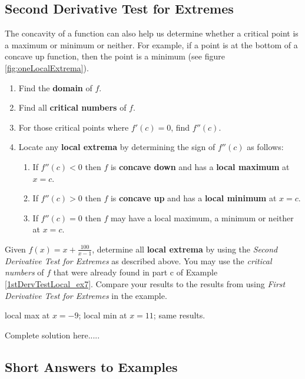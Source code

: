 \subsection*{Second Derivative Test for Extremes}
\noindent The concavity of a function can also help us determine whether a critical point is a maximum or minimum or neither. For example, if a point is at the bottom of a concave up function, then the point is a minimum (see figure \ref{fig:oneLocalExtrema}). 
\begin{tcolorbox}[title={The Second Derivative Test for Extremes:}]
\begin{enumerate}[leftmargin=*]
    \item Find the \textbf{domain} of $f$.
    \item Find all \textbf{critical numbers} of $f$.
    \item For those critical points where $f'(c)=0$, find $f''(c)$.
    \item Locate any \textbf{local extrema} by determining the sign of $f''(c)$ as follows:
    \renewcommand{\labelenumi}{(\alph{enumi})}
    \begin{enumerate}[leftmargin=*]
        \item If $f''(c)<0$ then $f$ is \textbf{concave down} and has a \textbf{local maximum} at $x=c$.
        \item If $f''(c)>0$ then $f$ is \textbf{concave up} and has a \textbf{local minimum} at $x=c$.
        \item If $f''(c)=0$ then $f$ may have a local maximum, a minimum or neither at $x=c$.
    \end{enumerate}
\end{enumerate}
\end{tcolorbox}
\vspace{-0.25cm}
\begin{example}
\noindent Given $f(x)=x+\displaystyle\frac{100}{x-1}$, determine all \textbf{local extrema} by using the \emph{Second Derivative Test for Extremes} as described above. You may use the \emph{critical numbers} of $f$ that were already found in part c of Example \ref{1stDervTestLocal_ex7}. Compare your results to the results from using \emph{First Derivative Test for Extremes} in the example. 
    \begin{sol}
    local max at $x=-9$; local min at $x=11$; same results.
    \end{sol}
    \begin{solL}
    Complete solution here.....
    
    \end{solL}
\end{example}



\newpage
\subsection*{Short Answers to Examples}
\begin{multicols}{2}

\end{multicols}


